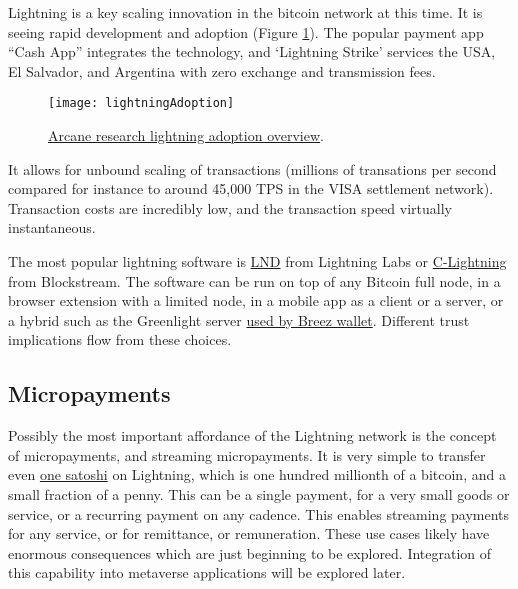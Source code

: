 Lightning is a key scaling innovation in the bitcoin network at this time. It is seeing rapid development and adoption (Figure \ref{fig:lightningAdoption}). The popular payment app ``Cash App'' integrates the technology, and `Lightning Strike' services the USA, El Salvador, and Argentina with zero exchange and transmission fees.
\begin{figure}
  \centering
    \texttt{[image: lightningAdoption]}
  \caption{\href{https://www.research.arcane.no/the-state-of-lightning}{Arcane research lightning adoption overview}.}
  \label{fig:lightningAdoption}
\end{figure}
It allows for unbound scaling of transactions (millions of transations per second compared for instance to around 45,000 TPS in the VISA settlement network). Transaction costs are incredibly low, and the transaction speed virtually instantaneous.\par
The most popular lightning software is \href{https://github.com/lightningnetwork/lnd#readme}{LND} from Lightning Labs or \href{https://github.com/ElementsProject/lightning}{C-Lightning} from Blockstream. The software can be run on top of any Bitcoin full node, in a browser extension with a limited node, in a mobile app as a client or a server, or a hybrid such as the Greenlight server \href{https://medium.com/breez-technology/get-ready-for-a-fresh-breez-multiple-apps-one-node-optimal-ux-519c4daf2536}{used by Breez wallet}. Different trust implications flow from these choices.
\subsection{Micropayments}
Possibly the most important affordance of the Lightning network is the concept of micropayments, and streaming micropayments. It is very simple to transfer even \href{https://satsymbol.com/}{one satoshi} on Lightning, which is one hundred millionth of a bitcoin, and a small fraction of a penny. This can be a single payment, for a very small goods or service, or a recurring payment on any cadence. This enables streaming payments for any service, or for remittance, or remuneration. These use cases likely have enormous consequences which are just beginning to be explored. Integration of this capability into metaverse applications will be explored later.
